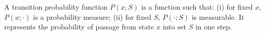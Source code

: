 A transition probability function $P(x; S)$ is a function such that: (i) for fixed $x$, $P(x; \cdot)$ is a probability measure; (ii) for fixed $S$, $P(\cdot; S)$ is measurable. It represents the probability of passage from state $x$ into set $S$ in one step.
